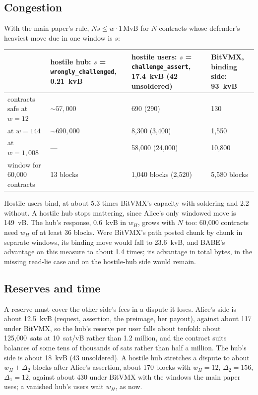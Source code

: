 \documentclass[11pt]{article}
\newcommand{\tx}[1]{\texttt{#1}}
\begin{document}
\subsection{Congestion}

With the main paper's rule, $N s \le w \cdot 1\,\mathrm{MvB}$ for $N$
contracts whose defender's heaviest move due in one window is $s$:
\begin{center}
\small
\begin{tabularx}{\linewidth}{>{\raggedright\arraybackslash}p{40mm}LLL}
\toprule
& hostile hub: $s$ = \tx{wrongly\_challenged}, 0.21~kvB & hostile users: $s$ = \tx{challenge\_assert}, 17.4~kvB (42 unsoldered) & BitVMX, binding side: 93~kvB \\
\midrule
contracts safe at $w = 12$ & ${\sim}57{,}000$ & 690 (290) & 130 \\
at $w = 144$ & ${\sim}690{,}000$ & 8,300 (3,400) & 1,550 \\
at $w = 1{,}008$ & --- & 58,000 (24,000) & 10,800 \\
window for 60,000 contracts & 13 blocks & 1,040 blocks (2,520) & 5,580 blocks \\
\bottomrule
\end{tabularx}
\end{center}
Hostile users bind, at about 5.3 times BitVMX's capacity with soldering
and 2.2 without. A hostile hub stops mattering, since Alice's only
windowed move is 149~vB. The hub's response, 0.6~kvB in $w_H$, grows
with $N$ too: 60,000 contracts need $w_H$ of at least 36 blocks. Were
BitVMX's path posted chunk by chunk in separate windows, its binding move
would fall to 23.6~kvB, and BABE's advantage on this measure to about
1.4 times; its advantage in total bytes, in the missing read-lie case
and on the hostile-hub side would remain.

\subsection{Reserves and time}

A reserve must cover the other side's fees in a dispute it loses. Alice's
side is about 12.5~kvB (request, assertion, the preimage, her payout),
against about 117 under BitVMX, so the hub's reserve per user falls
about tenfold: about 125,000~sats at 10~sat/vB rather than 1.2 million,
and the contract suits balances of some tens of thousands of sats
rather than half a million. The hub's side is about 18~kvB (43
unsoldered). A hostile hub stretches a dispute to about
$w_H + \Delta_2$ blocks after Alice's assertion, about 170 blocks with
$w_H = 12$, $\Delta_2 = 156$, $\Delta_1 = 12$, against about 430 under
BitVMX with the windows the main paper uses; a vanished hub's users wait
$w_H$, as now.
\end{document}
